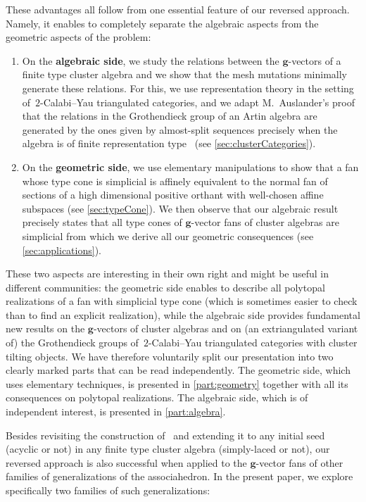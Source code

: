 \documentclass{amsart}
\theoremstyle{definition}
\renewcommand{\b}[1]{{\boldsymbol{#1}}} %
\begin{document}
\smallskip
\noindent
\enlargethispage{.3cm}
These advantages all follow from one essential feature of our reversed approach.
Namely, it enables to completely separate the algebraic aspects from the geometric aspects of the problem:
\begin{enumerate}[$\quad\bullet$]
\item On the \textbf{algebraic side}, we study the relations between the $\b{g}$-vectors of a finite type cluster algebra and we show that the mesh mutations minimally generate these relations.
For this, we use representation theory in the setting of~$2$-Calabi--Yau triangulated categories, and we adapt M.~Auslander's proof that the relations in the Grothendieck group of an Artin algebra are generated by the ones given by almost-split sequences precisely when the algebra is of finite representation type~\cite{Auslander1984} (see \cref{sec:clusterCategories}).

\smallskip
\item On the \textbf{geometric side}, we use elementary manipulations to show that a fan whose type cone is simplicial is affinely equivalent to the normal fan of sections of a high dimensional positive orthant with well-chosen affine subspaces (see \cref{sec:typeCone}). We then observe that our algebraic result precisely states that all type cones of $\b{g}$-vector fans of cluster algebras are simplicial from which we derive all our geometric consequences (see \cref{sec:applications}).
\end{enumerate}

\smallskip
\noindent
These two aspects are interesting in their own right and might be useful in different communities: the geometric side enables to describe all polytopal realizations of a fan with simplicial type cone (which is sometimes easier to check than to find an explicit realization), while the algebraic side provides fundamental new results on the $\b{g}$-vectors of cluster algebras and on (an extriangulated variant of) the Grothendieck groups of~$2$-Calabi--Yau triangulated categories with cluster tilting objects.
We have therefore voluntarily split our presentation into two clearly marked parts that can be read independently.
The geometric side, which uses elementary techniques, is presented in \cref{part:geometry} together with all its consequences on polytopal realizations.
The algebraic side, which is of independent interest, is presented in \cref{part:algebra}. 

\medskip
Besides revisiting the construction of~\cite{ArkaniHamedBaiHeYan, BazierMatteDouvilleMousavandThomasYildirim} and extending it to any initial seed (acyclic or not) in any finite type cluster algebra (simply-laced or not), our reversed approach is also successful when applied to the $\b{g}$-vector fans of other families of generalizations of the associahedron.
In the present paper, we explore specifically two families of such generalizations:
\end{document}
